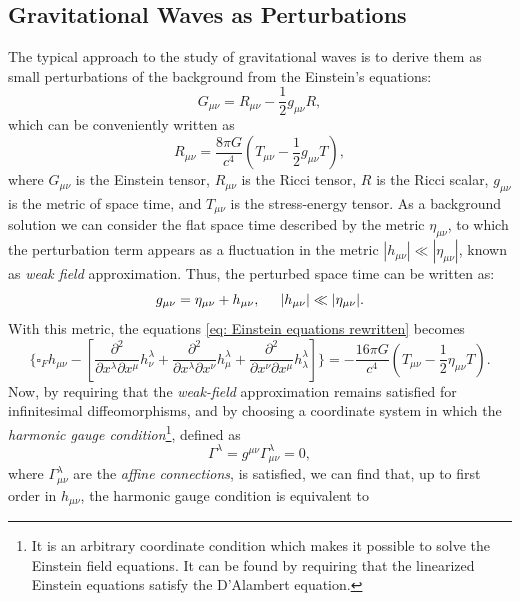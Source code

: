 \subsection{Gravitational Waves as Perturbations}
The typical approach to the study of gravitational waves is to derive them as small perturbations of the background from the Einstein's equations: 
\begin{equation}
    G_{\mu\nu} = R_{\mu\nu} - \frac{1}{2}g_{\mu\nu}R,
\end{equation}
which can be conveniently written as 
\begin{equation}
    R_{\mu\nu}=\frac{8\pi G}{c^4}\left(T_{\mu\nu} - \frac{1}{2}g_{\mu\nu}T\right),
    \label{eq: Einstein equations rewritten}
\end{equation}
where $G_{\mu\nu}$ is the Einstein tensor, $R_{\mu\nu}$ is the Ricci tensor, $R$ is the Ricci scalar, $g_{\mu\nu}$ is the metric of space time, and $T_{\mu\nu}$ is the stress-energy tensor.
As a background solution we can consider the flat space time described by the metric $\eta_{\mu\nu}$, to which the perturbation term appears as a fluctuation in the metric $|h_{\mu\nu}|\ll|\eta_{\mu\nu}|$, known as \textit{weak field} approximation. Thus, the perturbed space time can be written as:
\[
    g_{\mu\nu} = \eta_{\mu\nu} + h_{\mu\nu}, \hspace{5mm}  |h_{\mu\nu}|\ll|\eta_{\mu\nu}|.
\] 
With this metric, the equations \ref{eq: Einstein equations rewritten} becomes
\[
    \{\square_F h_{\mu\nu} - \left[\frac{\partial^2}{\partial x^\lambda\partial x^\mu}h^\lambda_\nu + \frac{\partial^2}{\partial x^\lambda\partial x^\nu}h^\lambda_\mu + \frac{\partial^2}{\partial x^\nu\partial x^\mu}h^\lambda_\lambda\right]\} = -\frac{16\pi G}{c^4}\left(T_{\mu\nu} - \frac{1}{2}\eta_{\mu\nu}T\right).
\]
Now, by requiring that the \textit{weak-field} approximation remains satisfied for infinitesimal diffeomorphisms, and by choosing a coordinate system in which the \textit{harmonic gauge condition}\footnote{It is an arbitrary coordinate condition which makes it possible to solve the Einstein field equations. It can be found by requiring that the linearized Einstein equations satisfy the D'Alambert equation.}, defined as 
\begin{equation}
    \Gamma^\lambda = g^{\mu\nu}\Gamma^\lambda_{\mu\nu} = 0,
    \label{eq: Harmonic gauge definition}
\end{equation}
where $\Gamma^\lambda_{\mu\nu}$ are the \textit{affine connections}, is satisfied, we can find that, up to first order in $h_{\mu\nu}$, the harmonic gauge condition is equivalent to 

